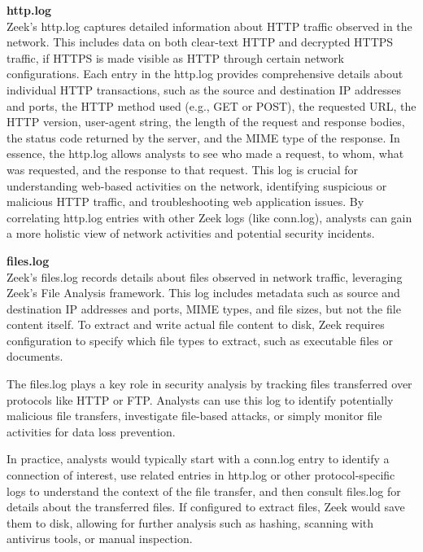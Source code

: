 \noindent \Large \textbf{http.log}
\vspace{5pt}
\\
\normalsize
Zeek's \colorbox{gray!20}{http.log} captures detailed information about HTTP traffic observed in the network. This includes data on both clear-text HTTP and decrypted HTTPS traffic, if HTTPS is made visible as HTTP through certain network configurations. Each entry in the \colorbox{gray!20}{http.log} provides comprehensive details about individual HTTP transactions, such as the source and destination IP addresses and ports, the HTTP method used (e.g., GET or POST), the requested URL, the HTTP version, user-agent string, the length of the request and response bodies, the status code returned by the server, and the MIME type of the response. In essence, the \colorbox{gray!20}{http.log} allows analysts to see who made a request, to whom, what was requested, and the response to that request. This log is crucial for understanding web-based activities on the network, identifying suspicious or malicious HTTP traffic, and troubleshooting web application issues. By correlating \colorbox{gray!20}{http.log} entries with other Zeek logs (like \colorbox{gray!20}{conn.log}), analysts can gain a more holistic view of network activities and potential security incidents.
\\
\vspace{1cm}


\noindent \Large \textbf{files.log}
\vspace{5pt}
\\
\normalsize
Zeek's \colorbox{gray!20}{files.log} records details about files observed in network traffic, leveraging Zeek's File Analysis framework. This log includes metadata such as source and destination IP addresses and ports, MIME types, and file sizes, but not the file content itself. To extract and write actual file content to disk, Zeek requires configuration to specify which file types to extract, such as executable files or documents.

The \colorbox{gray!20}{files.log} plays a key role in security analysis by tracking files transferred over protocols like HTTP or FTP. Analysts can use this log to identify potentially malicious file transfers, investigate file-based attacks, or simply monitor file activities for data loss prevention.

In practice, analysts would typically start with a conn.log entry to identify a connection of interest, use related entries in http.log or other protocol-specific logs to understand the context of the file transfer, and then consult \colorbox{gray!20}{files.log} for details about the transferred files. If configured to extract files, Zeek would save them to disk, allowing for further analysis such as hashing, scanning with antivirus tools, or manual inspection.

